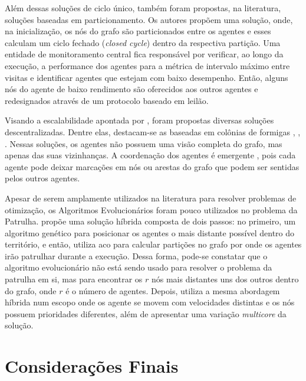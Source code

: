 Além dessas soluções de ciclo único, também foram propostas, na literatura, 
soluções baseadas em particionamento. Os autores 
\citep{Pippin:2013:PBT:2480362.2480378} propõem uma solução, onde, na 
inicialização, os nós do grafo são particionados entre os agentes e esses 
calculam um ciclo fechado (\textit{closed cycle}) dentro da respectiva partição. 
Uma entidade de monitoramento central fica responsável por verificar, ao longo 
da execução, a performance dos agentes para a métrica de intervalo máximo entre 
visitas e identificar agentes que estejam com baixo desempenho. Então, alguns 
nós do agente de baixo rendimento são oferecidos aos outros agentes e 
redesignados através de um protocolo baseado em leilão.

Visando a escalabilidade apontada por \citep{Almeida:2004:AAI}, foram propostas 
diversas soluções descentralizadas. Dentre elas, destacam-se as baseadas em 
colônias de formigas \citep{Koenig:2001:TCA:375735.376463}, 
\citep{Elor:2010:AMC:1884958.1884970}, \citep{6615158}. Nessas soluções, os 
agentes não possuem uma visão completa do grafo, mas apenas das suas 
vizinhanças. A coordenação dos agentes é emergente 
\citep{Machado:2002:MPE:1765317.1765332}, pois cada agente pode deixar marcações 
em nós ou arestas do grafo que podem ser sentidas pelos outros agentes.

Apesar de serem amplamente utilizados na literatura para resolver problemas de 
otimização, os Algoritmos Evolucionários \citep{Luke2013Metaheuristics} foram 
pouco utilizados no problema da Patrulha. \citep{4630897} propõe uma solução 
híbrida composta de dois passos: no primeiro, um algoritmo genético para 
posicionar os agentes o mais distante possível dentro do território, e então, 
utiliza \ac{aco} para calcular partições no grafo por onde os agentes irão 
patrulhar durante a execução. Dessa forma, pode-se constatar que o algoritmo 
evolucionário não está sendo usado para resolver o problema da patrulha em si, 
mas para encontrar os $r$ nós mais distantes uns dos outros dentro do grafo, 
onde $r$ é o número de agentes. Depois, \citep{6900280} utiliza a mesma 
abordagem híbrida num escopo onde os agente se movem com velocidades distintas e 
os nós possuem prioridades diferentes, além de apresentar uma variação 
\textit{multicore} da solução.

\section{Considerações Finais}

